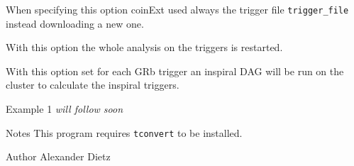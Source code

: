 \begin{entry}
\begin{entry}
\item[\option{--trigger} \parm{trigger\_file}]
When specifying this option coinExt used always the trigger file {\tt trigger\_file} instead downloading a new one.

\item[\option{--restart}]
With this option the whole analysis on the triggers is restarted.

\item[\option{--recalc}]
With this option set for each GRb trigger an inspiral DAG will be run on the cluster to calculate the inspiral triggers. 

\end{entry}



\item[Example 1] 
{\it will follow soon}

\item[Notes]
This program requires {\tt tconvert} to be installed.


\item[Author] 
Alexander Dietz
\end{entry}


